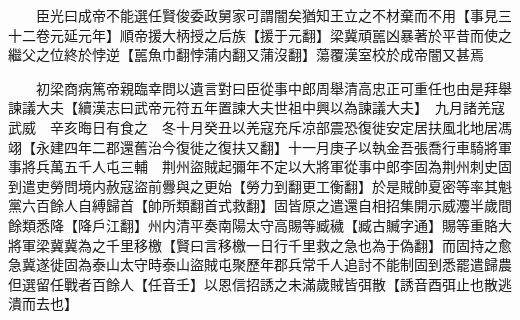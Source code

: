 　　臣光曰成帝不能選任賢俊委政舅家可謂闇矣猶知王立之不材棄而不用【事見三十二卷元延元年】順帝援大柄授之后族【援于元翻】梁冀頑嚚凶暴著於平昔而使之繼父之位終於悖逆【嚚魚巾翻悖蒲内翻又蒲沒翻】蕩覆漢室校於成帝闇又甚焉

　　初梁商病篤帝親臨幸問以遺言對曰臣從事中郎周舉清高忠正可重任也由是拜舉諫議大夫【續漢志曰武帝元符五年置諫大夫世祖中興以為諫議大夫】　九月諸羌寇武威　辛亥晦日有食之　冬十月癸丑以羌寇充斥凉部震恐復徙安定居扶風北地居馮翊【永建四年二郡還舊治今復徙之復扶又翻】十一月庚子以執金吾張喬行車騎將軍事將兵萬五千人屯三輔　荆州盜賊起彌年不定以大將軍從事中郎李固為荆州刺史固到遣吏勞問境内赦寇盜前釁與之更始【勞力到翻更工衡翻】於是賊帥夏密等率其魁黨六百餘人自縛歸首【帥所類翻首式救翻】固皆原之遣還自相招集開示威灋半歲間餘類悉降【降戶江翻】州内清平奏南陽太守高賜等臧穢【臧古贓字通】賜等重賂大將軍梁冀冀為之千里移檄【賢曰言移檄一日行千里救之急也為于偽翻】而固持之愈急冀遂徙固為泰山太守時泰山盜賊屯聚歷年郡兵常千人追討不能制固到悉罷遣歸農但選留任戰者百餘人【任音壬】以恩信招誘之未滿歲賊皆弭散【誘音酉弭止也散逃潰而去也】

